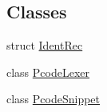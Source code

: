 \subsection*{Classes}
\begin{DoxyCompactItemize}
\item 
struct \mbox{\hyperlink{struct_ident_rec}{Ident\+Rec}}
\item 
class \mbox{\hyperlink{class_pcode_lexer}{Pcode\+Lexer}}
\item 
class \mbox{\hyperlink{class_pcode_snippet}{Pcode\+Snippet}}
\end{DoxyCompactItemize}
